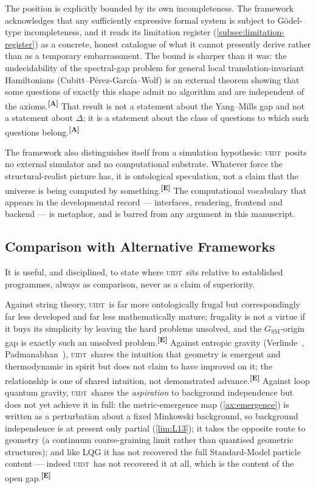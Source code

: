 \documentclass[12pt,a4paper,twoside]{article}
\theoremstyle{plain}
\theoremstyle{definition}
\theoremstyle{remark}
\newcommand{\UIDT}{\textsc{uidt}}
\newcommand{\catmark}[1]{\textsuperscript{\textsf{\textbf{[#1]}}}}
\begin{document}
The position is explicitly bounded by its own incompleteness. The
framework acknowledges that any sufficiently expressive formal system is
subject to G\"odel-type incompleteness, and it reads its limitation
register (\cref{subsec:limitation-register}) as a concrete, honest
catalogue of what it cannot presently derive rather than as a temporary
embarrassment. The bound is sharper than it was: the undecidability of
the spectral-gap problem for general local translation-invariant
Hamiltonians (Cubitt--P\'erez-Garc\'ia--Wolf) is an external theorem
showing that some questions of exactly this shape admit no algorithm and
are independent of the axioms.\catmark{A} That result is not a statement
about the Yang--Mills gap and not a statement about $\Delta$; it is a
statement about the class of questions to which such questions
belong.\catmark{A}

The framework also distinguishes itself from a simulation hypothesis:
\UIDT\ posits no external simulator and no computational substrate.
Whatever force the structural-realist picture has, it is ontological
speculation, not a claim that the universe is being computed by
something.\catmark{E} The computational vocabulary that appears in the
developmental record --- interfaces, rendering, frontend and backend ---
is metaphor, and is barred from any argument in this manuscript.

\subsection{Comparison with Alternative Frameworks}
\label{subsec:alt-frameworks}

It is useful, and disciplined, to state where \UIDT\ sits relative to
established programmes, always as comparison, never as a claim of
superiority.

Against string theory, \UIDT\ is far more ontologically frugal but
correspondingly far less developed and far less mathematically mature;
frugality is not a virtue if it buys its simplicity by leaving the hard
problems unsolved, and the $G_{\mathrm{SM}}$-origin gap is exactly such
an unsolved problem.\catmark{E} Against entropic gravity
(Verlinde~\cite{verlinde2011}, Padmanabhan~\cite{padmanabhan2010}),
\UIDT\ shares the intuition that geometry is emergent and thermodynamic
in spirit but does not claim to have improved on it; the relationship is
one of shared intuition, not demonstrated advance.\catmark{E} Against
loop quantum gravity, \UIDT\ shares the \emph{aspiration} to background
independence but does not yet achieve it in full: the metric-emergence
map (\cref{ax:emergence}) is written as a perturbation about a fixed
Minkowski background, so background independence is at present only
partial (\cref{lim:L13}); it takes the opposite route to geometry (a
continuum coarse-graining limit rather than quantised geometric
structures); and like LQG it has not recovered the full Standard-Model
particle content --- indeed \UIDT\ has not recovered it at all, which is
the content of the open gap.\catmark{E}
\end{document}
